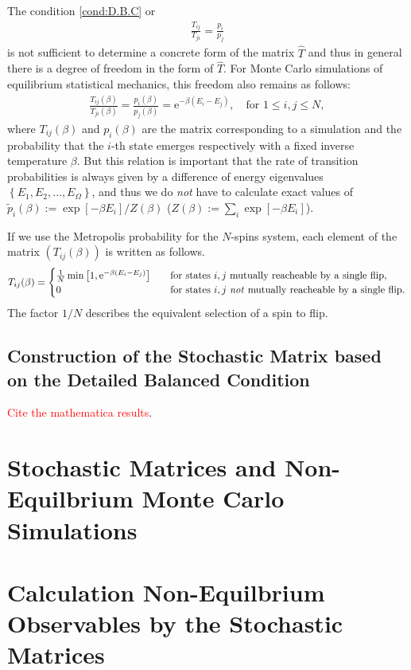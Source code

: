 The condition \eqref{cond:D.B.C} or
\begin{align}
\frac{T_{ij}}{T_{ji}} = \frac{p_{i}}{p_{j}}
\end{align}
is not sufficient to determine a concrete form of the matrix $\hat{T}$ and thus in general there is a degree of freedom in the form of $\hat{T}$. For Monte Carlo simulations of equilibrium statistical mechanics, this freedom also remains as follows:
\begin{align}
\frac{T_{ij}(\beta)}{T_{ji}(\beta)} = \frac{p_{i}(\beta)}{p_{j}(\beta)} = \mathrm{e}^{-\beta (E_{i}-E_{j})},\quad\text{for $1\leq i,j\leq N$},
\end{align}
where ${T_{ij}(\beta)}$ and $p_{i}(\beta)$ are the matrix corresponding to a simulation and the probability that the $i$-th state emerges respectively with a fixed inverse temperature $\beta$. But this relation is important that the rate of transition probabilities is always given by a difference of energy eigenvalues $\left\{E_{1},E_{2},\dots,E_{\Omega}\right\}$, and thus we do \textit{not} have to calculate exact values of $\tilde{p}_{i}(\beta):=\exp\left[-\beta E_{i}\right]/Z(\beta)$ ($Z(\beta):=\sum_{i}\exp\left[-\beta E_{i}\right]$).

If we use the Metropolis probability for the $N$-spins system, each element of the matrix $\left(T_{ij}(\beta)\right)$ is written as follows.
\begin{align}
T_{ij}(\beta)=
\begin{cases}
\frac{1}{N}\min\left[1,\mathrm{e}^{-\beta (E_{i}-E_{j})}\right]\quad&\text{for states $i,j$ mutually reacheable by a single flip},\\
0\quad&\text{for states $i,j$ \textit{not} mutually reacheable by a single flip}.
\end{cases}
\end{align}
The factor $1/N$ describes the equivalent selection of a spin to flip.

\subsection{Construction of the Stochastic Matrix based on the Detailed Balanced Condition}

\textcolor{red}{Cite the mathematica results}.

\section{Stochastic Matrices and Non-Equilbrium Monte Carlo Simulations}

\section{Calculation Non-Equilbrium Observables by the Stochastic Matrices}
